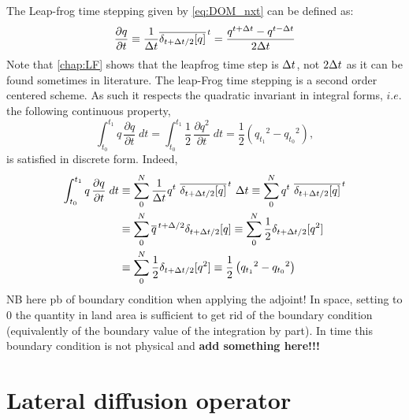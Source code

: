 \documentclass[../tex_main/NEMO_manual]{subfiles}
\begin{document}
The Leap-frog time stepping given by \autoref{eq:DOM_nxt} can be defined as:
\begin{equation} \label{eq:LF}
   \frac{\partial q}{\partial t} 
   		\equiv \frac{1}{\Delta t} \overline{ \delta_{t+\Delta t/2}[q]}^{\,t} 
		=         \frac{q^{t+\Delta t}-q^{t-\Delta t}}{2\Delta t}
\end{equation} 
Note that \autoref{chap:LF} shows that the leapfrog time step is $\Delta t$,
not $2\Delta t$ as it can be found sometimes in literature.
The leap-Frog time stepping is a second order centered scheme.
As such it respects the quadratic invariant in integral forms, $i.e.$ the following continuous property,
\begin{equation} \label{eq:Energy}
\int_{t_0}^{t_1} {q\, \frac{\partial q}{\partial t} \;dt} 
	=\int_{t_0}^{t_1} {\frac{1}{2}\, \frac{\partial q^2}{\partial t} \;dt} 
	=  \frac{1}{2} \left( {q_{t_1}}^2 - {q_{t_0}}^2 \right) ,
\end{equation}
is satisfied in discrete form.
Indeed, 
\begin{equation} \begin{split}
\int_{t_0}^{t_1} {q\, \frac{\partial q}{\partial t} \;dt} 
	&\equiv \sum\limits_{0}^{N} 
			{\frac{1}{\Delta t} q^t \ \overline{ \delta_{t+\Delta t/2}[q]}^{\,t} \ \Delta t} 
	   \equiv \sum\limits_{0}^{N}  { q^t \ \overline{ \delta_{t+\Delta t/2}[q]}^{\,t} } \\
	&\equiv \sum\limits_{0}^{N}  { \overline{q}^{\,t+\Delta/2}{ \delta_{t+\Delta t/2}[q]}}
	   \equiv \sum\limits_{0}^{N}  { \frac{1}{2} \delta_{t+\Delta t/2}[q^2] }\\
	&\equiv \sum\limits_{0}^{N}  { \frac{1}{2} \delta_{t+\Delta t/2}[q^2] }
	   \equiv \frac{1}{2} \left( {q_{t_1}}^2 - {q_{t_0}}^2 \right)
\end{split} \end{equation}
NB here pb of boundary condition when applying the adjoint!
In space, setting to 0 the quantity in land area is sufficient to get rid of the boundary condition 
(equivalently of the boundary value of the integration by part).
In time this boundary condition is not physical and \textbf{add something here!!!}







\section{Lateral diffusion operator}
\end{document}
